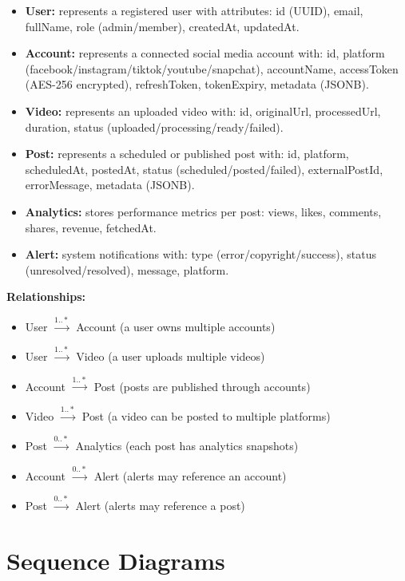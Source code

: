 \begin{itemize}
    \item \textbf{User:} represents a registered user with attributes: id (UUID), email, fullName, role (admin/member), createdAt, updatedAt.
    \item \textbf{Account:} represents a connected social media account with: id, platform (facebook/instagram/tiktok/youtube/snapchat), accountName, accessToken (AES-256 encrypted), refreshToken, tokenExpiry, metadata (JSONB).
    \item \textbf{Video:} represents an uploaded video with: id, originalUrl, processedUrl, duration, status (uploaded/processing/ready/failed).
    \item \textbf{Post:} represents a scheduled or published post with: id, platform, scheduledAt, postedAt, status (scheduled/posted/failed), externalPostId, errorMessage, metadata (JSONB).
    \item \textbf{Analytics:} stores performance metrics per post: views, likes, comments, shares, revenue, fetchedAt.
    \item \textbf{Alert:} system notifications with: type (error/copyright/success), status (unresolved/resolved), message, platform.
\end{itemize}

\textbf{Relationships:}
\begin{itemize}
    \item User $\xrightarrow{1..*}$ Account (a user owns multiple accounts)
    \item User $\xrightarrow{1..*}$ Video (a user uploads multiple videos)
    \item Account $\xrightarrow{1..*}$ Post (posts are published through accounts)
    \item Video $\xrightarrow{1..*}$ Post (a video can be posted to multiple platforms)
    \item Post $\xrightarrow{0..*}$ Analytics (each post has analytics snapshots)
    \item Account $\xrightarrow{0..*}$ Alert (alerts may reference an account)
    \item Post $\xrightarrow{0..*}$ Alert (alerts may reference a post)
\end{itemize}

\section{Sequence Diagrams}

